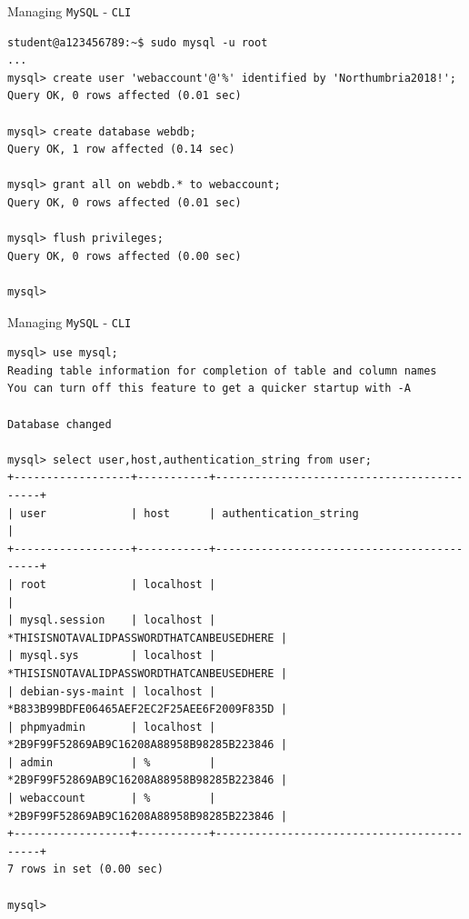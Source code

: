 \documentclass[xcolor=table,aspectratio=169]{beamer}
\begin{document}
\begin{frame}[fragile]{Managing \texttt{MySQL} - \texttt{CLI}}
  \begin{tcolorbox}
    \lstset{
      basicstyle=\tiny\ttfamily,
    }
    \begin{lstlisting}
student@a123456789:~$ sudo mysql -u root
...
mysql> create user 'webaccount'@'%' identified by 'Northumbria2018!';
Query OK, 0 rows affected (0.01 sec)

mysql> create database webdb;
Query OK, 1 row affected (0.14 sec)

mysql> grant all on webdb.* to webaccount;
Query OK, 0 rows affected (0.01 sec)

mysql> flush privileges;
Query OK, 0 rows affected (0.00 sec)

mysql>
    \end{lstlisting}
  \end{tcolorbox}
\end{frame}

\begin{frame}[fragile]{Managing \texttt{MySQL} - \texttt{CLI}}
  \begin{tcolorbox}
    \lstset{
      basicstyle=\Tiny\ttfamily,
    }
    \begin{lstlisting}
mysql> use mysql;
Reading table information for completion of table and column names
You can turn off this feature to get a quicker startup with -A
    
Database changed
      
mysql> select user,host,authentication_string from user;
+------------------+-----------+-------------------------------------------+
| user             | host      | authentication_string                     |
+------------------+-----------+-------------------------------------------+
| root             | localhost |                                           |
| mysql.session    | localhost | *THISISNOTAVALIDPASSWORDTHATCANBEUSEDHERE |
| mysql.sys        | localhost | *THISISNOTAVALIDPASSWORDTHATCANBEUSEDHERE |
| debian-sys-maint | localhost | *B833B99BDFE06465AEF2EC2F25AEE6F2009F835D |
| phpmyadmin       | localhost | *2B9F99F52869AB9C16208A88958B98285B223846 |
| admin            | %         | *2B9F99F52869AB9C16208A88958B98285B223846 |
| webaccount       | %         | *2B9F99F52869AB9C16208A88958B98285B223846 |
+------------------+-----------+-------------------------------------------+
7 rows in set (0.00 sec)
     
mysql>     
    \end{lstlisting}
  \end{tcolorbox}
\end{frame}
\end{document}
